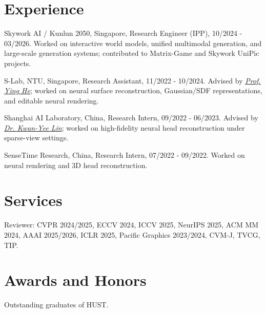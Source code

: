 \documentclass[11pt,letterpaper]{report}
\newcommand{\listitemspace}{0.25em}
\renewenvironment{itemize}
{\begin{list}{}{\setlength{\leftmargin}{0em}
                \setlength{\parskip}{0em}
                \setlength{\itemsep}{\listitemspace}
                \setlength{\parsep}{\listitemspace}}}
{\end{list}}
\begin{document}

    \section*{Experience}

    \begin{itemize}
        \item Skywork AI / Kunlun 2050, Singapore, Research Engineer (IPP), 10/2024 - 03/2026. Worked on interactive world models, unified multimodal generation, and large-scale generation systems; contributed to Matrix-Game and Skywork UniPic projects.
        \item S-Lab, NTU, Singapore, Research Assistant, 11/2022 - 10/2024. Advised by \href{https://personal.ntu.edu.sg/yhe/}{\textit{Prof. Ying He}}; worked on neural surface reconstruction, Gaussian/SDF representations, and editable neural rendering.
        \item Shanghai AI Laboratory, China, Research Intern, 09/2022 - 06/2023. Advised by \href{https://kwanyeelin.github.io/}{\textit{Dr. Kwan-Yee Lin}}; worked on high-fidelity neural head reconstruction under sparse-view settings.
        \item SenseTime Research, China, Research Intern, 07/2022 - 09/2022. Worked on neural rendering and 3D head reconstruction.
    \end{itemize}
    \vspace{-0.25in}
    \section*{Services}
    Reviewer: CVPR 2024/2025, ECCV 2024, ICCV 2025, NeurIPS 2025, ACM MM 2024, AAAI 2025/2026, ICLR 2025, Pacific Graphics 2023/2024, CVM-J, TVCG, TIP.

    \section*{Awards and Honors}

    \begin{tablist}

        \item[2022] \tab{} Outstanding graduates of HUST.

    \end{tablist}
\end{document}
